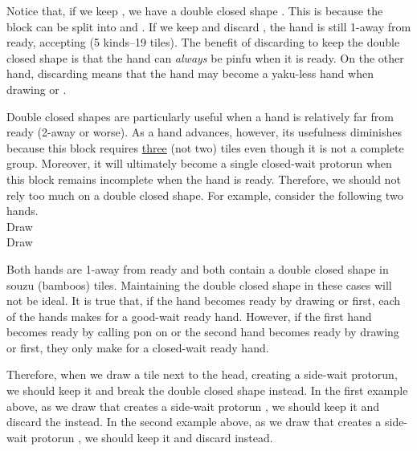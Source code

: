 \bigskip
Notice that, if we keep {\LARGE{}}, we have a double closed shape {\LARGE{}}. This is because the block {\LARGE{}} can be split into {\LARGE{}} and {\LARGE{}}. 
If we keep {\LARGE{}} and discard {\LARGE{}}, the hand is still 1-away from ready, accepting {\LARGE{}} (5 kinds--19 tiles). The benefit of discarding {\LARGE{}} to keep the double closed shape is that the hand can \emph{always} be {\jap pinfu} when it is ready. On the other hand, discarding {\LARGE{}} means that the hand may become a {\jap yaku}-less hand when drawing {\LARGE{}} or {\LARGE{}}.

\bigskip
Double closed shapes are particularly useful when a hand is relatively far from ready (2-away or worse). As a hand advances, however, its usefulness diminishes because this block requires \underline{three} (not two) tiles even though it is not a complete group. 
Moreover, it will ultimately become a single closed-wait protorun when this block remains incomplete when the hand is ready. 
Therefore, we should not rely too much on a double closed shape. 
For example, consider the following two hands. 
\bp
{}\zhong\zhong~\\
\hfill\footnotesize{Draw~~~~~~~~~~~~~~~}
\ep 
\vspace{-20pt}
\bp
{}~\\
\hfill\footnotesize{Draw~~~~~~~~~~~~~~~}
\ep

Both hands are 1-away from ready and both contain a double closed shape in {\jap souzu} (bamboos) tiles. Maintaining the double closed shape in these cases will not be ideal. 
It is true that, if the hand becomes ready by drawing {\LARGE{}} or  {\LARGE{}} first, each of the hands makes for a good-wait ready hand. However, if the first hand becomes ready by calling {\jap pon} on {\LARGE\zhong} or the second hand becomes ready by drawing {\LARGE{}} or {\LARGE{}} first, they only make for a closed-wait ready hand. 

\bigskip
Therefore, when we draw a tile next to the head, creating a side-wait protorun, we should keep it and break the double closed shape instead. In the first example above, as we draw {\LARGE{}} that creates a side-wait protorun {\LARGE{}}, we should keep it and discard the {\LARGE{}} instead. In the second example above, as we draw {\LARGE{}} that creates a side-wait protorun {\LARGE{}}, we should keep it and discard {\LARGE{}} instead. 

